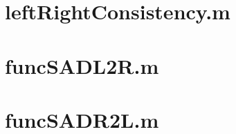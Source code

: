 \documentclass[12pt]{report}
\newcommand{\nullpage}{\newpage\null\thispagestyle{empty}}  %
\begin{document}
		\newpage
		\section{leftRightConsistency.m}
		\label{sec:leftRightConsistency}
				
			
		\newpage
		\section{funcSADL2R.m}
		\label{sec:funcSADL2R}
			
			
		\newpage
		\section{funcSADR2L.m}
		\label{sec:funcSADR2L}
					




	\nullpage
	
\end{document}
